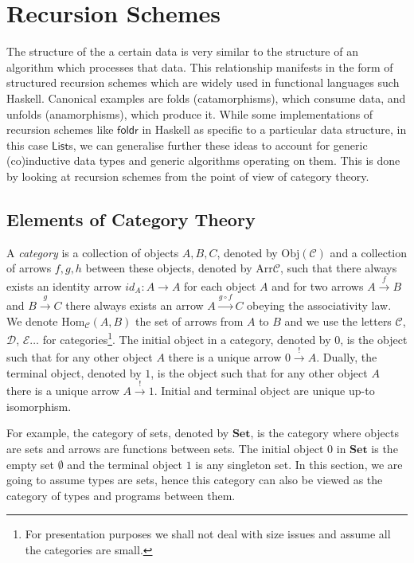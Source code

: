 \documentclass{llncs}
\newcommand{\operator}[1]{\textsf{#1}}
\newcommand{\CatC}{\mathcal{C}}
\newcommand{\CatD}{\mathcal{D}}
\newcommand{\CatE}{\mathcal{E}}
\newcommand{\Set}{\mathbf{Set}}
\newcommand{\Hom}{\text{Hom}}
\newcommand{\Obj}{\text{Obj}}
\newcommand{\Arr}{\text{Arr}}
\begin{document}
\section{Recursion Schemes}
The structure of the a certain data is very similar to the structure of an
algorithm which processes that data. This relationship manifests in the form of
structured recursion schemes which are widely used in functional languages such
Haskell. Canonical examples are folds (catamorphisms), which consume data, and
unfolds (anamorphisms), which produce it. While some implementations of
recursion schemes like $\operator{foldr}$ in Haskell as specific to a particular
data structure, in this case $\operator{List}$s, we can generalise further these
ideas to account for generic (co)inductive data types and generic algorithms
operating on them. This is done by looking at recursion schemes from the point
of view of category theory.

\subsection{Elements of Category Theory}
A \emph{category} is a collection of objects $A, B, C$, denoted by $\Obj(\CatC)$
and a collection of arrows $f, g, h$ between these objects, denoted by
$\Arr{\CatC}$, such that there always exists an identity arrow
$id_{A} : A \to A$ for each object $A$ and for two arrows $A \xrightarrow{f} B$
and $B \xrightarrow{g} C$ there always exists an arrow
$A \xrightarrow{g\circ f} C$ obeying the associativity law. We denote
$\Hom_{\CatC} (A, B)$ the set of arrows from $A$ to $B$ and we use the letters
$\CatC$, $\CatD$, $\CatE\dots$ for categories\footnote[1]{For presentation
purposes we shall not deal with size issues and assume all the categories are
small.}. The initial object in a category, denoted by $0$, is the object such
that for any other object $A$ there is a unique arrow $0 \xrightarrow{!} A$.
Dually, the terminal object, denoted by $1$, is the object such that for any
other object $A$ there is a unique arrow $A \xrightarrow{!} 1$. Initial and
terminal object are unique up-to isomorphism.

For example, the category of sets, denoted by $\Set$, is the category where
objects are sets and arrows are functions between sets. The initial object $0$
in $\Set$ is the empty set $\emptyset$ and the terminal object $1$ is any
singleton set. In this section, we are going to assume types are sets, hence
this category can also be viewed as the category of types and programs between
them.
\end{document}
